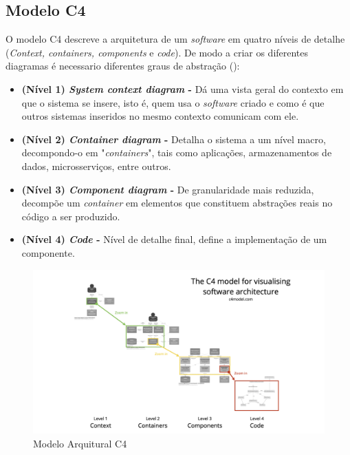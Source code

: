 \subsection{Modelo C4}
\label{subsec:modelC4}

O modelo C4 descreve a arquitetura de um \textit{software} em quatro níveis de detalhe (\textit{Context, containers, components} e \textit{code}). De modo a criar os diferentes diagramas é necessario diferentes graus de abstração (\cite{Brown2018}):

\begin{itemize}
    \item \textbf{(Nível 1) \textit{System context diagram} -} Dá uma vista geral do contexto em que o sistema se insere, isto é, quem usa o \textit{software} criado e como é que outros sistemas inseridos no mesmo contexto comunicam com ele. 
    \item \textbf{(Nível 2) \textit{Container diagram} -} Detalha o sistema a um nível macro, decompondo-o em "\textit{containers}", tais como aplicações, armazenamentos de dados, microsserviços, entre outros.
    \item \textbf{(Nível 3) \textit{Component diagram} -} De granularidade mais reduzida, decompõe um     \textit{container} em elementos que constituem abstrações reais no código a ser produzido.
    \item \textbf{(Nível 4) \textit{Code} -} Nível de detalhe final, define a implementação de um componente.
\end{itemize}

\begin{figure}[H]
    \centering
    \includegraphics[width=\linewidth,keepaspectratio]{frontmatter/assets/diagrams/c4-overview.png}
    \caption{Modelo Arquitural C4}
    \label{fig:c4model}
\end{figure}

